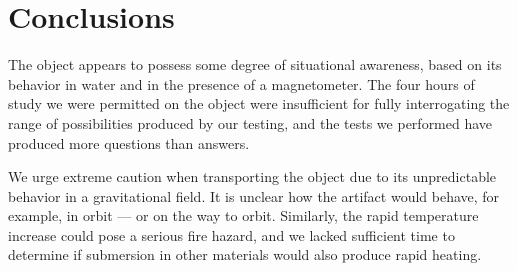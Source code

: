 \documentclass[10pt]{article}
\begin{document}
\section{Conclusions}\label{conclusions}
The object appears to possess some degree of situational awareness, based on its behavior in water and in the presence of a magnetometer.
The four hours of study we were permitted on the object were insufficient for fully interrogating the range of possibilities produced by our testing, and the tests we performed have produced more questions than answers.

We urge extreme caution when transporting the object due to its unpredictable behavior in a gravitational field.
It is unclear how the artifact would behave, for example, in orbit --- or on the way to orbit.
Similarly, the rapid temperature increase could pose a serious fire hazard, and we lacked sufficient time to determine if submersion in other materials would also produce rapid heating.



\end{document}
